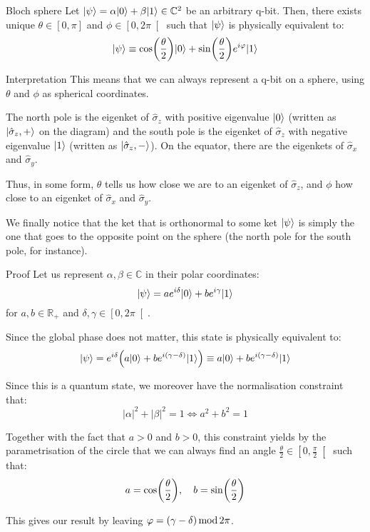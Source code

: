 \documentclass[a4paper]{article}
\begin{document}
\begin{parag}{Bloch sphere}
    Let $\ket{\psi} = \alpha \ket{0} + \beta \ket{1} \in \mathbb{C}^2$ be an arbitrary q-bit. Then, there exists unique $\theta \in \left[0, \pi\right]$ and $\phi \in \left[0, 2\pi\right[$ such that $\ket{\psi}$ is physically equivalent to:
    \[\ket{\psi} \equiv \cos\left(\frac{\theta}{2}\right)\ket{0} + \sin\left(\frac{\theta}{2}\right) e^{i \phi} \ket{1}\]
    
    \begin{subparag}{Interpretation}
        This means that we can always represent a q-bit on a sphere, using $\theta$ and $\phi$ as spherical coordinates. 

        The north pole is the eigenket of $\hat{\sigma}_z$ with positive eigenvalue $\ket{0}$ (written as $\ket{\hat{\sigma}_z, +}$ on the diagram) and the south pole is the eigenket of $\hat{\sigma}_z$ with negative eigenvalue $\ket{1}$ (written as $\ket{\hat{\sigma}_z, -}$). On the equator, there are the eigenkets of $\hat{\sigma}_x$ and $\hat{\sigma}_y$. 

        Thus, in some form, $\theta$ tells us how close we are to an eigenket of $\hat{\sigma}_z$, and $\phi$ how close to an eigenket of $\hat{\sigma}_x$ and $\hat{\sigma}_y$.

        We finally notice that the ket that is orthonormal to some ket $\ket{\psi}$ is simply the one that goes to the opposite point on the sphere (the north pole for the south pole, for instance).
    \end{subparag}

    \begin{subparag}{Proof}
        Let us represent $\alpha, \beta \in \mathbb{C}$ in their polar coordinates: 
        \[\ket{\psi} = a e^{i \delta} \ket{0} + b e^{i \gamma} \ket{1}\]
        for $a, b \in \mathbb{R}_+$ and $\delta, \gamma \in \left[0, 2\pi\right[$. 

        Since the global phase does not matter, this state is physically equivalent to: 
        \[\ket{\psi} = e^{i\delta}\left(a \ket{0} + b e^{i \left(\gamma - \delta\right)}\ket{1}\right) \equiv a \ket{0} + be^{i \left(\gamma - \delta\right)} \ket{1}\]

        Since this is a quantum state, we moreover have the normalisation constraint that: 
        \[\left|\alpha\right|^2 + \left|\beta\right|^2 = 1 \iff a^2 + b^2 = 1\]

        Together with the fact that $a > 0$ and $b > 0$, this constraint yields by the parametrisation of the circle that we can always find an angle $\frac{\theta}{2} \in \left[0, \frac{\pi}{2}\right[ $ such that:
        \[a = \cos\left(\frac{\theta}{2}\right), \mathspace b = \sin\left(\frac{\theta}{2}\right)\]

        This gives our result by leaving $\phi = \left(\gamma - \delta\right) \Mod 2\pi$.
    \end{subparag}
\end{parag}
\end{document}
